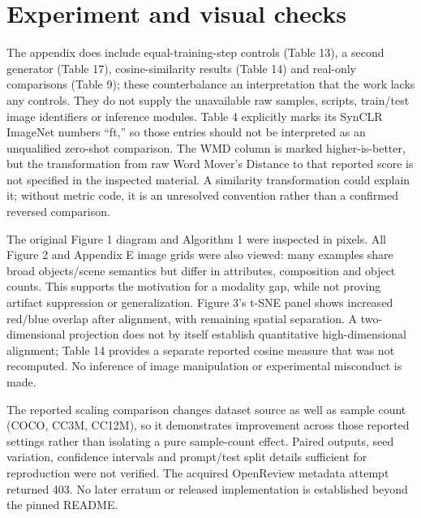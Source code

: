 \documentclass[10pt]{article}
\begin{document}
\section*{Experiment and visual checks}
The appendix does include equal-training-step controls (Table 13), a second generator (Table 17), cosine-similarity results (Table 14) and real-only comparisons (Table 9); these counterbalance an interpretation that the work lacks any controls. They do not supply the unavailable raw samples, scripts, train/test image identifiers or inference modules. Table 4 explicitly marks its SynCLR ImageNet numbers “ft,” so those entries should not be interpreted as an unqualified zero-shot comparison. The WMD column is marked higher-is-better, but the transformation from raw Word Mover’s Distance to that reported score is not specified in the inspected material. A similarity transformation could explain it; without metric code, it is an unresolved convention rather than a confirmed reversed comparison.\par
The original Figure 1 diagram and Algorithm 1 were inspected in pixels. All Figure 2 and Appendix E image grids were also viewed: many examples share broad objects/scene semantics but differ in attributes, composition and object counts. This supports the motivation for a modality gap, while not proving artifact suppression or generalization. Figure 3’s t-SNE panel shows increased red/blue overlap after alignment, with remaining spatial separation. A two-dimensional projection does not by itself establish quantitative high-dimensional alignment; Table 14 provides a separate reported cosine measure that was not recomputed. No inference of image manipulation or experimental misconduct is made.\par
The reported scaling comparison changes dataset source as well as sample count (COCO, CC3M, CC12M), so it demonstrates improvement across those reported settings rather than isolating a pure sample-count effect. Paired outputs, seed variation, confidence intervals and prompt/test split details sufficient for reproduction were not verified. The acquired OpenReview metadata attempt returned 403. No later erratum or released implementation is established beyond the pinned README.\par
\end{document}
